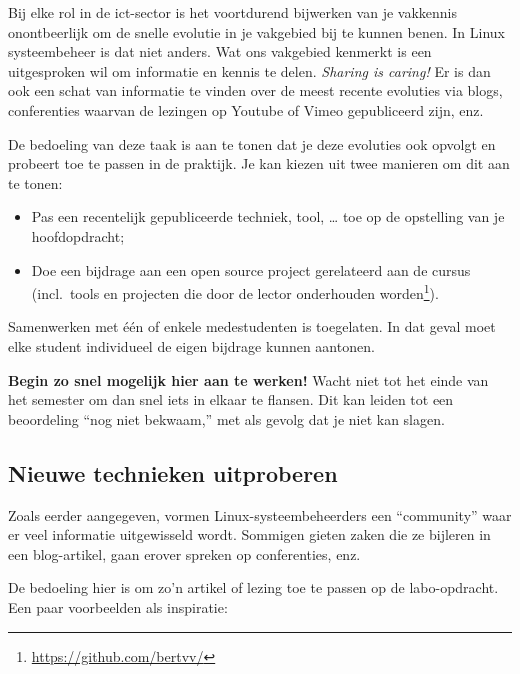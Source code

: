 Bij elke rol in de ict-sector is het voortdurend bijwerken van je vakkennis onontbeerlijk om de snelle evolutie in je vakgebied bij te kunnen benen. In Linux systeembeheer is dat niet anders. Wat ons vakgebied kenmerkt is een uitgesproken wil om informatie en kennis te delen. \emph{Sharing is caring!} Er is dan ook een schat van informatie te vinden over de meest recente evoluties via blogs, conferenties waarvan de lezingen op Youtube of Vimeo gepubliceerd zijn, enz.

De bedoeling van deze taak is aan te tonen dat je deze evoluties ook opvolgt en probeert toe te passen in de praktijk. Je kan kiezen uit twee manieren om dit aan te tonen:

\begin{itemize}
\item Pas een recentelijk gepubliceerde techniek, tool, \ldots{} toe op de opstelling van je hoofdopdracht;
\item Doe een bijdrage aan een open source project gerelateerd aan de cursus (incl.~tools en projecten die door de lector onderhouden worden\footnote{\url{https://github.com/bertvv/}}).
\end{itemize}

Samenwerken met één of enkele medestudenten is toegelaten. In dat geval moet elke student individueel de eigen bijdrage kunnen aantonen.

\textbf{Begin zo snel mogelijk hier aan te werken!} Wacht niet tot het einde van het semester om dan snel iets in elkaar te flansen. Dit kan leiden tot een beoordeling ``nog niet bekwaam,'' met als gevolg dat je niet kan slagen.

\subsection{Nieuwe technieken uitproberen}
\label{subs:nieuwe-technieken-uitproberen}

Zoals eerder aangegeven, vormen Linux-systeembeheerders een ``community'' waar er veel informatie uitgewisseld wordt. Sommigen gieten zaken die ze bijleren in een blog-artikel, gaan erover spreken op conferenties, enz.

De bedoeling hier is om zo'n artikel of lezing toe te passen op de labo-opdracht. Een paar voorbeelden als inspiratie:


